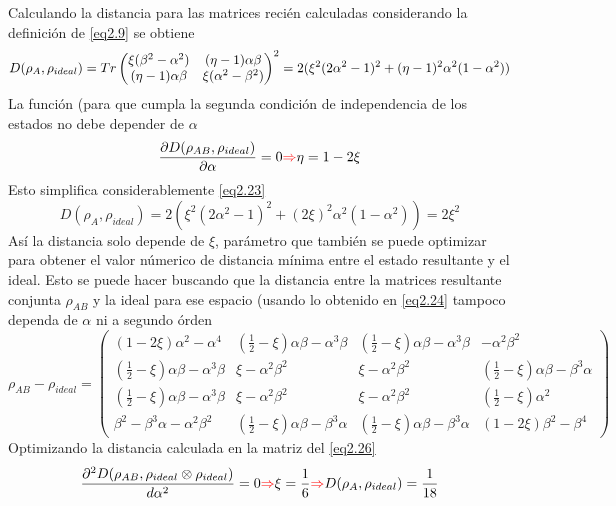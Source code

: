 \documentclass{book}
\begin{document}
Calculando la distancia para las matrices recién calculadas considerando la definición de \textcolor{blue}{\ref{eq2.9}} se obtiene
\begin{equation}{\label{eq2.23}D(\rho_{A},\rho_{ideal})=Tr\begin{pmatrix} \xi(\beta^2-\alpha^2)& (\eta-1)\alpha\beta  \\ (\eta-1)\alpha\beta &\xi(\alpha^2-\beta^2) \end{pmatrix}^2=2(\xi^2(2\alpha^2-1)^2+(\eta-1)^2\alpha^2(1-\alpha^2))}\end{equation}
La función (para que cumpla la segunda condición de independencia de los estados no debe depender de $\alpha$
\begin{equation}\label{eq2.24}{\frac{\partial D(\rho_{AB},\rho_{ideal})}{\partial\alpha}=0 \textcolor{red}{\Rightarrow} \eta=1-2\xi}\end{equation}
Esto simplifica considerablemente \textcolor{blue}{\ref{eq2.23}}
\begin{equation}\label{eq2.25}{D(\rho_{A},\rho_{ideal})=2(\xi^2(2\alpha^2-1)^2+(2\xi)^2\alpha^2(1-\alpha^2))=2\xi^2}\end{equation}
Así la distancia solo depende de $\xi$, parámetro que también se puede optimizar para obtener el valor númerico de distancia mínima entre el estado resultante y el ideal. Esto se puede hacer buscando que la distancia entre la matrices resultante conjunta $\rho_{AB}$ y la ideal para ese espacio (usando lo obtenido en \textcolor{blue}{\ref{eq2.24}} tampoco dependa de $\alpha$ ni a segundo órden
\begin{equation}\label{eq2.26}{ \rho_{AB}-\rho_{ideal}=\begin{pmatrix} (1-2\xi)\alpha^2-\alpha^4 & (\frac{1}{2}-\xi)\alpha\beta-\alpha^3\beta& (\frac{1}{2}-\xi)\alpha\beta-\alpha^3\beta& -\alpha^2\beta^2\\ (\frac{1}{2}-\xi)\alpha\beta-\alpha^3\beta& \xi-\alpha^2\beta^2& \xi-\alpha^2\beta^2 &(\frac{1}{2}-\xi)\alpha\beta-\beta^3\alpha\\  (\frac{1}{2}-\xi)\alpha\beta-\alpha^3\beta& \xi-\alpha^2\beta^2& \xi-\alpha^2\beta^2 &(\frac{1}{2}-\xi)\alpha^2 \\ \beta^2-\beta^3\alpha -\alpha^2\beta^2 & (\frac{1}{2}-\xi)\alpha\beta-\beta^3 \alpha& (\frac{1}{2}-\xi)\alpha\beta-\beta^3\alpha & (1-2\xi)\beta^2-\beta^4 \end{pmatrix}}\end{equation}
Optimizando la distancia calculada en la matriz del \textcolor{blue}{\ref{eq2.26}}
\begin{equation}\label{eq2.27}{\frac{\partial^2 D(\rho_{AB},\rho_{ideal}\otimes\rho_{ideal})}{d\alpha^2}=0 \textcolor{red}{\Rightarrow} \xi=\frac{1}{6} \textcolor{red}{\Rightarrow} D(\rho_A, \rho_{ideal})=\frac{1}{18}}\end{equation}
\end{document}
